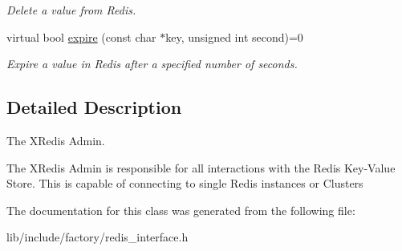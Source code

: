 \begin{DoxyCompactItemize}
\begin{DoxyCompactList}\small\item\em Delete a value from Redis. \end{DoxyCompactList}\item 
\hypertarget{classRedisInterface_ac327841b5c3d227be88f164495e32dd0}{virtual bool \hyperlink{classRedisInterface_ac327841b5c3d227be88f164495e32dd0}{expire} (const char $\ast$key, unsigned int second)=0}\label{classRedisInterface_ac327841b5c3d227be88f164495e32dd0}

\begin{DoxyCompactList}\small\item\em Expire a value in Redis after a specified number of seconds. \end{DoxyCompactList}\end{DoxyCompactItemize}


\subsection{Detailed Description}
The X\-Redis Admin. 

The X\-Redis Admin is responsible for all interactions with the Redis Key-\/\-Value Store. This is capable of connecting to single Redis instances or Clusters 

The documentation for this class was generated from the following file\-:\begin{DoxyCompactItemize}
\item 
lib/include/factory/redis\-\_\-interface.\-h\end{DoxyCompactItemize}
